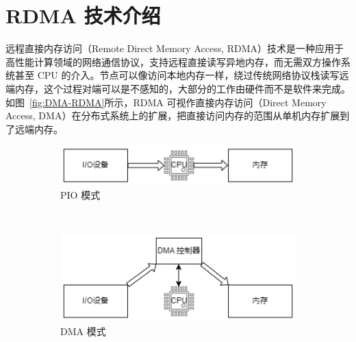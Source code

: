 {\section{RDMA 技术介绍}
远程直接内存访问（Remote Direct Memory Access, RDMA）技术是一种应用于高性能计算领域的网络通信协议，支持远程直接读写异地内存，而无需双方操作系统甚至 CPU 的介入。节点可以像访问本地内存一样，绕过传统网络协议栈读写远端内存，这个过程对端可以是不感知的，大部分的工作由硬件而不是软件来完成。如图~\ref{fig:DMA-RDMA}所示，RDMA 可视作直接内存访问（Direct Memory Access, DMA）在分布式系统上的扩展，把直接访问内存的范围从单机内存扩展到了远端内存。
\begin{figure}[!htbp]
	\centering
	\begin{subfigure}[b]{0.40\textwidth}
		\includegraphics[width=\textwidth]{Img/PIO.png}
		\caption{PIO 模式}
		\label{fig:PIO}
	\end{subfigure}
	~~~~ %
	\begin{subfigure}[b]{0.40\textwidth}
		\includegraphics[width=\textwidth]{Img/DMA.png}
		\caption{DMA 模式}
		\label{fig:DMA}
	\end{subfigure}
	\\ %
    \begin{subfigure}[b]{0.40\textwidth}

\end{subfigure}
\end{figure}}
